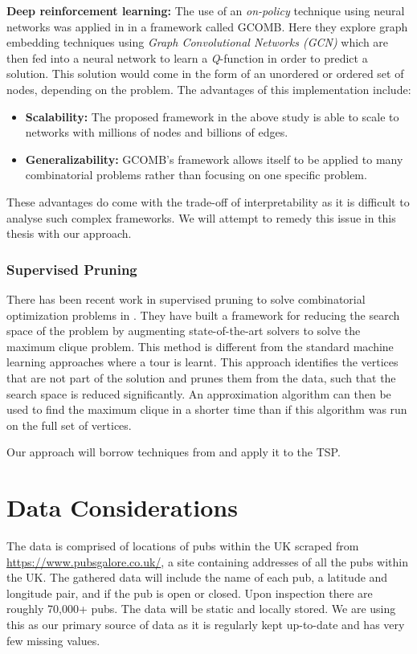 \documentclass[]{UCD_CS_FYP_Report}
\begin{document}
\textbf{Deep reinforcement learning:}
The use of an \textit{on-policy} technique using neural networks was applied in \cite{DeepRL} in a framework called \textsc{GCOMB}. Here they explore graph embedding techniques using \textit{Graph Convolutional Networks (GCN)} which are then fed into a neural network to learn a \textit{Q}-function in order to predict a solution. This solution would come in the form of an unordered or ordered set of nodes, depending on the problem. The advantages of this implementation include: 
\begin{itemize}
  \item \textbf{Scalability: }The proposed framework in the above study is able to scale to networks with millions of nodes and billions of edges.
  \item \textbf{Generalizability: }\textsc{GCOMB}'s framework allows itself to be applied to many combinatorial problems rather than focusing on one specific problem.
\end{itemize}
These advantages do come with the trade-off of interpretability as it is difficult to analyse such complex frameworks. We will attempt to remedy this issue in this thesis with our approach.

\subsection{Supervised Pruning}
There has been recent work in supervised pruning to solve combinatorial optimization problems in \cite{iAAA}. They have built a framework for reducing the search space of the problem by augmenting state-of-the-art solvers to solve the maximum clique problem. This method is different from the standard machine learning approaches where a tour is learnt. This approach identifies the vertices that are not part of the solution and prunes them from the data, such that the search space is reduced significantly. An approximation algorithm can then be used to find the maximum clique in a shorter time than if this algorithm was run on the full set of vertices.

Our approach will borrow techniques from \cite{iAAA} and apply it to the TSP.




\chapter{Data Considerations}
The data is comprised of locations of pubs within the UK scraped from \url{https://www.pubsgalore.co.uk/}, a site containing addresses of all the pubs within the UK. The gathered data will include the name of each pub, a latitude  and longitude pair, and if the pub is open or closed.  Upon inspection there are roughly 70,000+ pubs. The data will be static and locally stored. We are using this as our primary source of data as it is regularly kept up-to-date and has very few missing values.
\end{document}
